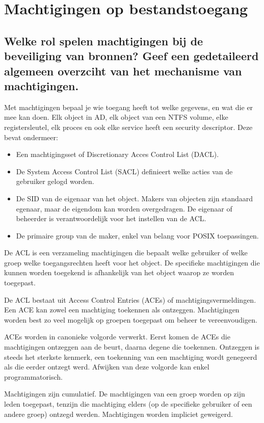 \chapter{Machtigingen op bestandstoegang}

\section{Welke rol spelen machtigingen bij de beveiliging van bronnen? Geef een
gedetaileerd algemeen overzciht van het mechanisme van machtigingen.}

Met machtigingen bepaal je wie toegang heeft tot welke gegevens, en wat die er
mee kan doen. Elk object in AD, elk object van een NTFS volume, elke
registersleutel, elk proces en ook elke service heeft een security descriptor.
Deze bevat ondermeer:
\begin{itemize}
	\item Een machtigingsset of Discretionary Acces Control List (DACL).
	\item De System Access Control List (SACL) definieert welke acties van
		de gebruiker gelogd worden.
	\item De SID van de eigenaar van het object. Makers van objecten zijn
		standaard egenaar, maar de eigendom kan worden overgedragen. De
		eigenaar of beheerder is verantwoordelijk voor het instellen van
		de ACL.
	\item De primaire group van de maker, enkel van belang voor POSIX
		toepassingen.
\end{itemize}

De ACL is een verzameling machtigingen die bepaalt welke gebruiker of welke
groep welke toegangsrechten heeft voor het object. De specifieke machtigingen
die kunnen worden toegekend is afhankelijk van het object waarop ze worden
toegepast.

De ACL bestaat uit Access Control Entries (ACEs) of machtigingsvermeldingen. Een
ACE kan zowel een machtiging toekennen als ontzeggen. Machtigingen worden best
zo veel mogelijk op groepen toegepast om beheer te vereenvoudigen.

ACEs worden in canonieke volgorde verwerkt. Eerst komen de ACEs die machtigingen
ontzeggen aan de beurt, daarna degene die toekennen. Ontzeggen is steeds het
sterkste kenmerk, een toekenning van een machtiging wordt genegeerd als die
eerder ontzegt werd. Afwijken van deze volgorde kan enkel programmatorisch.

Machtigingen zijn cumulatief. De machtigingen van een groep worden op zijn leden
toegepast, tenzijn die machtiging elders (op de specifieke gebruiker of een
andere groep) ontzegd werden. Machtigingen worden impliciet geweigerd.

